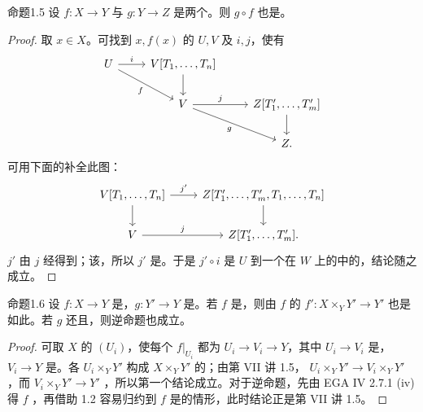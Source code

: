 \begin{SGAresult}{命题}{1.5}
设 $f:X\to Y$ 与 $g:Y\to Z$ 是两个。则 $g\circ f$ 也是。
\end{SGAresult}
\begin{proof}
取 $x\in X$。可找到 $x,f(x)$ 的 $U,V$ 及 $i,j$，使有
\[
\begin{tikzcd}U\arrow[r,"i"]\arrow[dr,"f"']&V[T_1,\ldots,T_n]\arrow[d]\\&V\arrow[r,"j"]\arrow[dr,"g"']&Z[T'_1,\ldots,T'_m]\arrow[d]\\&&Z.\end{tikzcd}
\]
可用下面的补全此图：
\[
\begin{tikzcd}V[T_1,\ldots,T_n]\arrow[r,"j'"]\arrow[d]&Z[T'_1,\ldots,T'_m,T_1,\ldots,T_n]\arrow[d]\\V\arrow[r,"j"]&Z[T'_1,\ldots,T'_m].\end{tikzcd}
\]
$j'$ 由 $j$ 经得到；该，所以 $j'$ 是。于是 $j'\circ i$ 是 $U$ 到一个在 $W$ 上的中的，结论随之成立。
\end{proof}
\begin{SGAresult}{命题}{1.6}
设 $f:X\to Y$ 是，$g:Y'\to Y$ 是。若 $f$ 是，则由 $f$ 的 $f':X\times_YY'\to Y'$ 也是如此。若 $g$ 还且，则逆命题也成立。
\end{SGAresult}
\begin{proof}
可取 $X$ 的 $(U_i)$，使每个 $f|_{U_i}$ 都为 $U_i\to V_i\to Y$，其中 $U_i\to V_i$ 是，$V_i\to Y$ 是。各 $U_i\times_YY'$ 构成 $X\times_YY'$ 的；由第 VII 讲 1.5， $U_i\times_YY'\to V_i\times_YY'$ ，而 $V_i\times_YY'\to Y'$ ，所以第一个结论成立。对于逆命题，先由 EGA IV 2.7.1 (iv) 得 $f$ ，再借助 1.2 容易归约到 $f$ 是的情形，此时结论正是第 VII 讲 1.5。
\end{proof}
